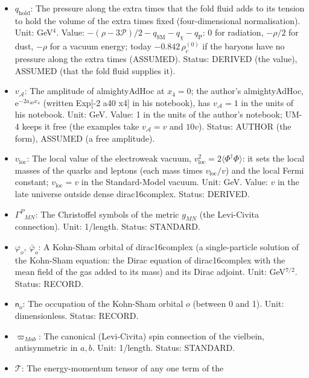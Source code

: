 \documentclass[
  10pt,
]{article}
\begin{document}
\begin{itemize}
  Kohn-Sham state,
  \(n_{\mathrm{s}} = \langle\bar\Psi\Psi\rangle = \mathrm{tr}\,\mathcal{N}\).
  Unit: GeV\(^7\). Status: DERIVED.
\item
  \(q_{\mathrm{hold}}\): The pressure along the extra times that the
  fold fluid adds to its tension to hold the volume of the extra times
  fixed (four-dimensional normalisation). Unit: GeV\(^4\). Value:
  \(-(\rho - 3\mathcal{P})/2 - q_{\mathrm{SM}} - q_\chi - q_{\mathrm{P}}\):
  0 for radiation, \(-\rho/2\) for dust, \(-\rho\) for a vacuum energy;
  today \(-0.842\,\rho_{\mathrm{c}}^{(0)}\) if the baryons have no
  pressure along the extra times (ASSUMED). Status: DERIVED (the value),
  ASSUMED (that the fold fluid supplies it).
\item
  \(v_{\mathcal{A}}\): The amplitude of almightyAdHoc at \(x_4 = 0\);
  the author's almightyAdHoc, \(\mathrm{e}^{-2a_{40}x_4}\) (written
  Exp{[}-2 a40 x4{]} in his notebook), has \(v_{\mathcal{A}} = 1\) in
  the units of his notebook. Unit: GeV. Value: 1 in the units of the
  author's notebook; UM-4 keeps it free (the examples take
  \(v_{\mathcal{A}} = v\) and \(10v\)). Status: AUTHOR (the form),
  ASSUMED (a free amplitude).
\item
  \(v_{\mathrm{loc}}\): The local value of the electroweak vacuum,
  \(v_{\mathrm{loc}}^2 = 2\langle\Phi^\dagger\Phi\rangle\): it sets the
  local masses of the quarks and leptons (each mass times
  \(v_{\mathrm{loc}}/v\)) and the local Fermi constant;
  \(v_{\mathrm{loc}} = v\) in the Standard-Model vacuum. Unit: GeV.
  Value: \(v\) in the late universe outside dense dirac16complex.
  Status: DERIVED.
\item
  \(\Gamma^P{}_{MN}\): The Christoffel symbols of the metric \(g_{MN}\)
  (the Levi-Civita connection). Unit: 1/length. Status: STANDARD.
\item
  \(\varphi_o,\ \bar\varphi_o\): A Kohn-Sham orbital of dirac16complex
  (a single-particle solution of the Kohn-Sham equation: the Dirac
  equation of dirac16complex with the mean field of the gas added to its
  mass) and its Dirac adjoint. Unit: GeV\(^{7/2}\). Status: RECORD.
\item
  \(\mathsf{n}_o\): The occupation of the Kohn-Sham orbital \(o\)
  (between 0 and 1). Unit: dimensionless. Status: RECORD.
\item
  \(\varpi_{Mab}\): The canonical (Levi-Civita) spin connection of the
  vielbein, antisymmetric in \(a, b\). Unit: 1/length. Status: STANDARD.
\item
  \(\mathcal{T}\): The energy-momentum tensor of any one term of the

\end{itemize}
\end{document}
